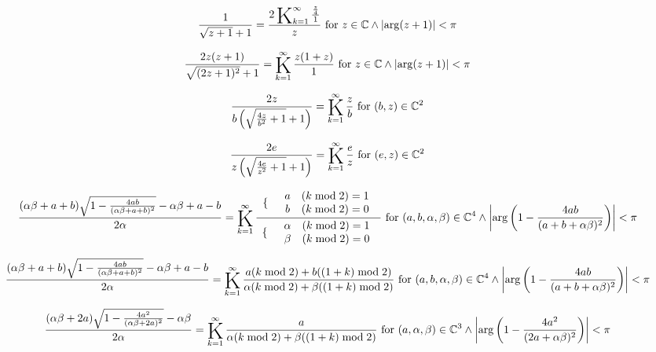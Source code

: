 \documentclass{article}
\newcommand{\bigK}{\mathop{\raisebox{-5pt}{\huge K}}}
\begin{document}
\[\frac{1}{\sqrt{z+1}+1}=\frac{2 \bigK_{k=1}^{\infty}\frac{\frac{z}{4}}{1}}{z}\text{ for }z\in \mathbb{C}\land \left| \arg (z+1)\right| <\pi\] 

\[\frac{2 z (z+1)}{\sqrt{(2 z+1)^2}+1}=\bigK_{k=1}^{\infty}\frac{z (1+z)}{1}\text{ for }z\in \mathbb{C}\land \left| \arg (z+1)\right| <\pi\] 

\[\frac{2 z}{b \left(\sqrt{\frac{4 z}{b^2}+1}+1\right)}=\bigK_{k=1}^{\infty}\frac{z}{b}\text{ for }(b,z)\in \mathbb{C}^2\] 

\[\frac{2 e}{z \left(\sqrt{\frac{4 e}{z^2}+1}+1\right)}=\bigK_{k=1}^{\infty}\frac{e}{z}\text{ for }(e,z)\in \mathbb{C}^2\] 

\[\frac{(\alpha  \beta +a+b) \sqrt{1-\frac{4 a b}{(\alpha  \beta +a+b)^2}}-\alpha  \beta +a-b}{2 \alpha }=\bigK_{k=1}^{\infty}\frac{ \begin{array}{cc}  \{ &  \begin{array}{cc}  a & (k \bmod 2)=1 \\  b & (k \bmod 2)=0 \\ \end{array}  \\ \end{array} }{ \begin{array}{cc}  \{ &  \begin{array}{cc}  \alpha  & (k \bmod 2)=1 \\  \beta  & (k \bmod 2)=0 \\ \end{array}  \\ \end{array} }\text{ for }(a,b,\alpha ,\beta )\in \mathbb{C}^4\land \left| \arg \left(1-\frac{4 a b}{(a+b+\alpha  \beta )^2}\right)\right| <\pi\] 

\[\frac{(\alpha  \beta +a+b) \sqrt{1-\frac{4 a b}{(\alpha  \beta +a+b)^2}}-\alpha  \beta +a-b}{2 \alpha }=\bigK_{k=1}^{\infty}\frac{a (k \bmod 2)+b ((1+k) \bmod 2)}{\alpha  (k \bmod 2)+\beta  ((1+k) \bmod 2)}\text{ for }(a,b,\alpha ,\beta )\in \mathbb{C}^4\land \left| \arg \left(1-\frac{4 a b}{(a+b+\alpha  \beta )^2}\right)\right| <\pi\] 

\[\frac{(\alpha  \beta +2 a) \sqrt{1-\frac{4 a^2}{(\alpha  \beta +2 a)^2}}-\alpha  \beta }{2 \alpha }=\bigK_{k=1}^{\infty}\frac{a}{\alpha  (k \bmod 2)+\beta  ((1+k) \bmod 2)}\text{ for }(a,\alpha ,\beta )\in \mathbb{C}^3\land \left| \arg \left(1-\frac{4 a^2}{(2 a+\alpha  \beta )^2}\right)\right| <\pi\] 
\end{document}
